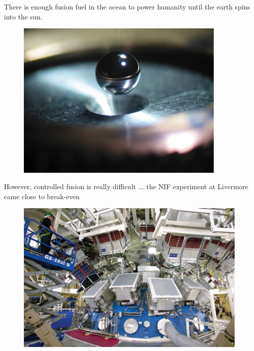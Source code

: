\documentclass{beamer}
\begin{document}
        \begin{frame}{There is enough fusion fuel in the ocean to power humanity until the earth spins into the sun.}
            \begin{figure}
                \centering
                \includegraphics[width=0.9\textwidth]{./img/lifeFuel.png}
                \caption*{}
            \end{figure}
        \end{frame}

        \begin{frame}{However, controlled fusion is really difficult ... the NIF experiment at Livermore came close to break-even}
            \begin{figure}
                \centering
                \includegraphics[width=1.0\textwidth]{./img/nifChamber.png}
                \caption*{}
            \end{figure}
        \end{frame}
\end{document}
